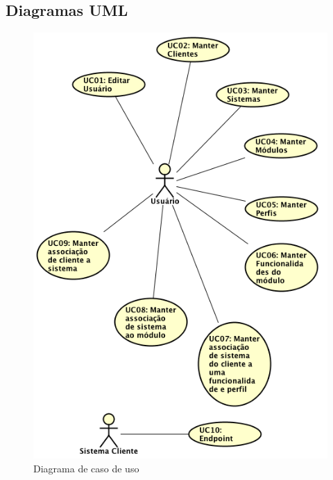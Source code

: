 \subsection{Diagramas UML}


\begin{figure}
	\label{fig:Diagrama de caso de uso}
	\includegraphics[width=1\textwidth]{img/Diagrama_de_caso_de_uso}
	\caption{Diagrama de caso de uso}
\end{figure}


